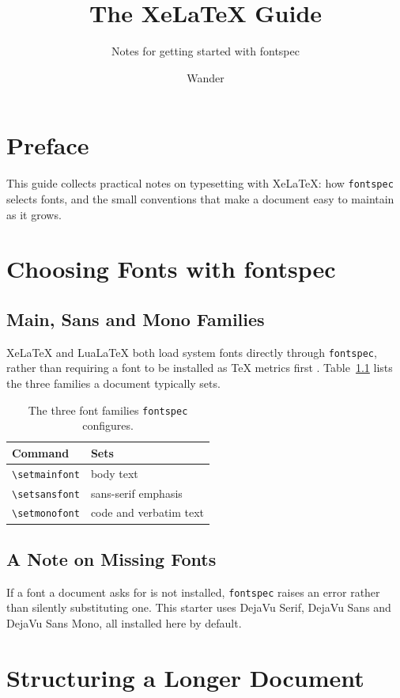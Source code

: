 \documentclass[12pt,oneside]{book}
\title{The XeLaTeX Guide}
\subtitle{Notes for getting started with fontspec}
\author{Wander}
\begin{document}
\makemytitle

\frontmatter
{}
\chapter*{Preface}
This guide collects practical notes on typesetting with XeLaTeX: how
\texttt{fontspec} selects fonts, and the small conventions that make a
document easy to maintain as it grows.

\tableofcontents

\mainmatter

\chapter{Choosing Fonts with fontspec}

\section{Main, Sans and Mono Families}

XeLaTeX and LuaLaTeX both load system fonts directly through
\texttt{fontspec}, rather than requiring a font to be installed as TeX
metrics first \citep{knuth1984texbook}. Table~\ref{tab:families} lists the
three families a document typically sets.

\begin{table}[h]
  \centering
  \begin{tabular}{ll}
    \toprule
    Command & Sets \\
    \midrule
    \verb|\setmainfont|  & body text \\
    \verb|\setsansfont|  & sans-serif emphasis \\
    \verb|\setmonofont|  & code and verbatim text \\
    \bottomrule
  \end{tabular}
  \caption{The three font families \texttt{fontspec} configures.}
  \label{tab:families}
\end{table}

\section{A Note on Missing Fonts}

If a font a document asks for is not installed, \texttt{fontspec} raises an
error rather than silently substituting one. This starter uses DejaVu Serif,
DejaVu Sans and DejaVu Sans Mono, all installed here by default.

\chapter{Structuring a Longer Document}
\end{document}
